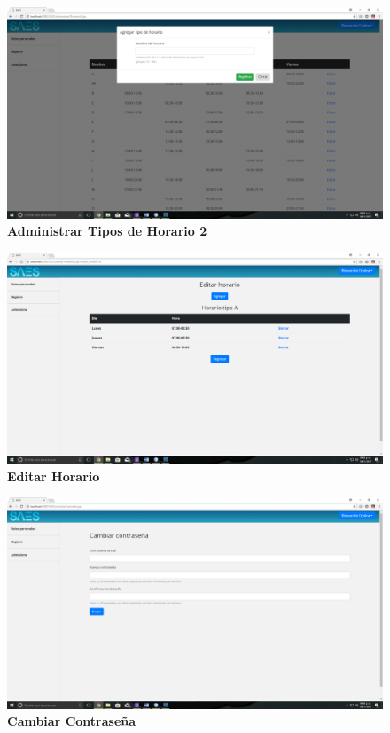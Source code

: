 \begin{figure}[H]
  \centering
    \includegraphics[scale=0.2]{project/images/48.png}
  \caption{\textbf{Administrar Tipos de Horario 2}}
\end{figure}
\begin{figure}[H]
  \centering
    \includegraphics[scale=0.2]{project/images/49.png}
  \caption{\textbf{Editar Horario}}
\end{figure}
\begin{figure}[H]
  \centering
    \includegraphics[scale=0.2]{project/images/50.png}
  \caption{\textbf{Cambiar Contraseña}}
\end{figure}
